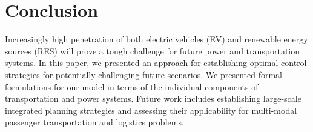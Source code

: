 \section{Conclusion}
\label{conclusion}

Increasingly high penetration of both electric vehicles (EV) and renewable energy sources (RES) will prove a tough challenge for future power and transportation systems. In this paper, we presented an approach for establishing optimal control strategies for potentially challenging future scenarios. We presented formal formulations for our model in terms of the individual components of transportation and power systems. 
Future work includes establishing large-scale integrated planning strategies and assessing their applicability for multi-modal passenger transportation and logistics problems.

